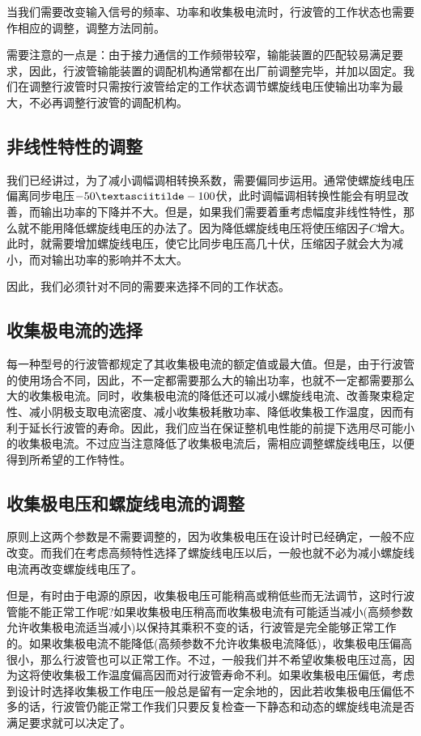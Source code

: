 当我们需要改变输入信号的频率、功率和收集极电流时，行波管的工作状态也需要作相应的调整，调整方法同前。

需要注意的一点是：由于接力通信的工作频带较窄，输能装置的匹配较易满足要求，因此，行波管输能装置的调配机构通常都在出厂前调整完毕，并加以固定。我们在调整行波管时只需按行波管给定的工作状态调节螺旋线电压使输出功率为最大，不必再调整行波管的调配机构。
\subsection{非线性特性的调整}
我们已经讲过，为了减小调幅调相转换系数，需要偏同步运用。通常使螺旋线电压偏离同步电压$ -50\textasciitilde-100 $伏，此时调幅调相转换性能会有明显改善，而输出功率的下降并不大。但是，如果我们需要着重考虑幅度非线性特性，那么就不能用降低螺旋线电压的办法了。因为降低螺旋线电压将使压缩因子$ C $增大。此时，就需要增加螺旋线电压，使它比同步电压高几十伏，压缩因子就会大为减小，而对输出功率的影响并不太大。

因此，我们必须针对不同的需要来选择不同的工作状态。
\subsection{收集极电流的选择}
每一种型号的行波管都规定了其收集极电流的额定值或最大值。但是，由于行波管的使用场合不同，因此，不一定都需要那么大的输出功率，也就不一定都需要那么大的收集极电流。同时，收集极电流的降低还可以减小螺旋线电流、改善聚束稳定性、减小阴极支取电流密度、减小收集极耗散功率、降低收集极工作温度，因而有利于延长行波管的寿命。因此，我们应当在保证整机电性能的前提下选用尽可能小的收集极电流。不过应当注意降低了收集极电流后，需相应调整螺旋线电压，以便得到所希望的工作特性。
\subsection{收集极电压和螺旋线电流的调整}
原则上这两个参数是不需要调整的，因为收集极电压在设计时已经确定，一般不应改变。而我们在考虑高频特性选择了螺旋线电压以后，一般也就不必为减小螺旋线电流再改变螺旋线电压了。

但是，有时由于电源的原因，收集极电压可能稍高或稍低些而无法调节，这时行波管能不能正常工作呢?如果收集极电压稍高而收集极电流有可能适当减小(高频参数允许收集极电流适当减小)以保持其乘积不变的话，行波管是完全能够正常工作的。如果收集极电流不能降低(高频参数不允许收集极电流降低)，收集极电压偏高很小，那么行波管也可以正常工作。不过，一般我们并不希望收集极电压过高，因为这将使收集极工作温度偏高因而对行波管寿命不利。如果收集极电压偏低，考虑到设计时选择收集极工作电压一般总是留有一定余地的，因此若收集极电压偏低不多的话，行波管仍能正常工作我们只要反复检查一下静态和动态的螺旋线电流是否满足要求就可以决定了。

